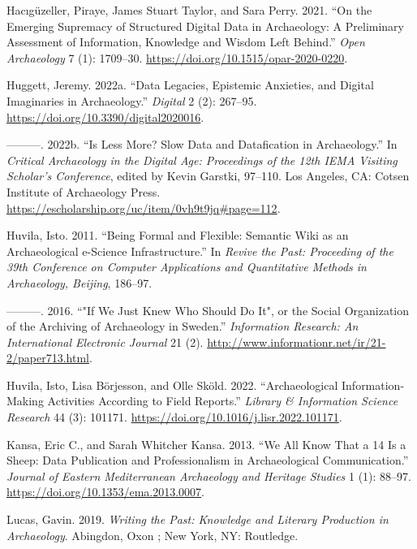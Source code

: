 \documentclass[
]{article}
\newlength{\cslhangindent}
\newenvironment{CSLReferences}[2] %
 {\begin{list}{}{%
  \setlength{\itemindent}{0pt}
  \setlength{\leftmargin}{0pt}
  \setlength{\parsep}{0pt}
  \ifodd #1
   \setlength{\leftmargin}{\cslhangindent}
   \setlength{\itemindent}{-1\cslhangindent}
  \fi
  \setlength{\itemsep}{#2\baselineskip}}}
 {\end{list}}
\begin{document}
\begin{CSLReferences}{1}{0}
Hacıgüzeller, Piraye, James Stuart Taylor, and Sara Perry. 2021. {``On
the {Emerging Supremacy} of {Structured Digital Data} in {Archaeology}:
{A Preliminary Assessment} of {Information}, {Knowledge} and {Wisdom
Left Behind}.''} \emph{Open Archaeology} 7 (1): 1709--30.
\url{https://doi.org/10.1515/opar-2020-0220}.

Huggett, Jeremy. 2022a. {``Data {Legacies}, {Epistemic Anxieties}, and
{Digital Imaginaries} in {Archaeology}.''} \emph{Digital} 2 (2):
267--95. \url{https://doi.org/10.3390/digital2020016}.

---------. 2022b. {``Is {Less More}? {Slow Data} and {Datafication} in
{Archaeology}.''} In \emph{Critical {Archaeology} in the {Digital Age}:
{Proceedings} of the 12th {IEMA Visiting Scholar}'s {Conference}},
edited by Kevin Garstki, 97--110. Los Angeles, CA: Cotsen Institute of
Archaeology Press.
\url{https://escholarship.org/uc/item/0vh9t9jq\#page=112}.

Huvila, Isto. 2011. {``Being Formal and Flexible: Semantic Wiki as an
Archaeological e-Science Infrastructure.''} In \emph{Revive the {Past}:
{Proceeding} of the 39th {Conference} on {Computer Applications} and
{Quantitative Methods} in {Archaeology}, {Beijing}}, 186--97.

---------. 2016. {``"{If We Just Knew Who Should Do It}", or the {Social
Organization} of the {Archiving} of {Archaeology} in {Sweden}.''}
\emph{Information Research: An International Electronic Journal} 21 (2).
\url{http://www.informationr.net/ir/21-2/paper713.html}.

Huvila, Isto, Lisa Börjesson, and Olle Sköld. 2022. {``Archaeological
Information-Making Activities According to Field Reports.''}
\emph{Library \& Information Science Research} 44 (3): 101171.
\url{https://doi.org/10.1016/j.lisr.2022.101171}.

Kansa, Eric C., and Sarah Whitcher Kansa. 2013. {``We {All Know That} a
14 {Is} a {Sheep}: {Data Publication} and {Professionalism} in
{Archaeological Communication}.''} \emph{Journal of Eastern
Mediterranean Archaeology and Heritage Studies} 1 (1): 88--97.
\url{https://doi.org/10.1353/ema.2013.0007}.

Lucas, Gavin. 2019. \emph{Writing the Past: {Knowledge} and Literary
Production in Archaeology}. Abingdon, Oxon ; New York, NY: Routledge.


\end{CSLReferences}
\end{document}
